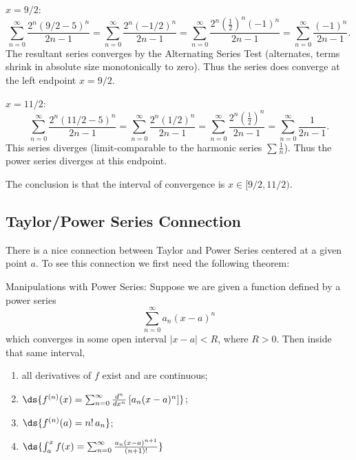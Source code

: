 \begin{description}\item\underline{$x=9/2$}:
$$\sum_{n=0}^\infty\frac{2^n(9/2-5)^n}{2n-1}
=\sum_{n=0}^\infty\frac{2^n(-1/2)^n}{2n-1}
=\sum_{n=0}^\infty\frac{2^n\left(\frac12\right)^n(-1)^n}{2n-1}
=\sum_{n=0}^\infty\frac{(-1)^n}{2n-1}.$$
The resultant series converges by the Alternating Series Test
(alternates, terms shrink in absolute size monotonically to zero).
Thus the series does converge at the left endpoint $x=9/2$.
\item\underline{$x=11/2$}:
$$\sum_{n=0}^\infty\frac{2^n(11/2-5)^n}{2n-1}
=\sum_{n=0}^\infty\frac{2^n(1/2)^n}{2n-1}
=\sum_{n=0}^\infty\frac{2^n\left(\frac12\right)^n}{2n-1}
=\sum_{n=0}^\infty\frac{1}{2n-1}.$$
This series diverges (limit-comparable to the harmonic series $\sum\frac1n$).
Thus the power series diverges at this endpoint.
\end{description}
The conclusion is that the interval of convergence is 
$x\in[9/2,11/2)$.
\eex



\newpage
\subsection{Taylor/Power Series Connection}
There is a nice connection between Taylor and Power Series
centered at a given point $a$.  To see this connection
we first need the following theorem:
\begin{theorem}{\rm Manipulations with Power Series: } 
Suppose we are given a function defined by a power series 
\begin{equation}
\sum_{n=0}^\infty a_n(x-a)^n\end{equation}
which converges in some open interval $|x-a|<R$, where
$R>0$. Then inside that same interval,
\begin{enumerate}
\item all derivatives of $f$ exist and are continuous;
\item $\ds{f^{(n)}(x)=\sum_{n=0}^\infty
\frac{d^n}{dx^n}\left[a_n(x-a)^n\right]}$;
\item $\ds{f^{(n)}(a)=n!\,a_n}$;
\item $\ds{\int_a^xf(x)=\sum_{n=0}^\infty
\frac{a_n(x-a)^{n+1}}{(n+1)!}}$\end{enumerate}
\label{PowerSeriesManipulations}
\end{theorem}


